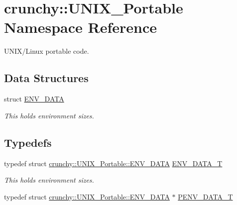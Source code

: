 \hypertarget{namespacecrunchy_1_1_u_n_i_x___portable}{}\section{crunchy\+:\+:U\+N\+I\+X\+\_\+\+Portable Namespace Reference}
\label{namespacecrunchy_1_1_u_n_i_x___portable}


U\+N\+I\+X/\+Linux portable code.  


\subsection*{Data Structures}
\begin{DoxyCompactItemize}
\item 
struct \hyperlink{structcrunchy_1_1_u_n_i_x___portable_1_1_e_n_v___d_a_t_a}{E\+N\+V\+\_\+\+D\+A\+T\+A}
\begin{DoxyCompactList}\small\item\em This holds environment sizes. \end{DoxyCompactList}\end{DoxyCompactItemize}
\subsection*{Typedefs}
\begin{DoxyCompactItemize}
\item 
typedef struct \hyperlink{structcrunchy_1_1_u_n_i_x___portable_1_1_e_n_v___d_a_t_a}{crunchy\+::\+U\+N\+I\+X\+\_\+\+Portable\+::\+E\+N\+V\+\_\+\+D\+A\+T\+A} \hyperlink{namespacecrunchy_1_1_u_n_i_x___portable_a200439e6a525bf357a766278278cda8f}{E\+N\+V\+\_\+\+D\+A\+T\+A\+\_\+\+T}
\begin{DoxyCompactList}\small\item\em This holds environment sizes. \end{DoxyCompactList}\item 
typedef struct \hyperlink{structcrunchy_1_1_u_n_i_x___portable_1_1_e_n_v___d_a_t_a}{crunchy\+::\+U\+N\+I\+X\+\_\+\+Portable\+::\+E\+N\+V\+\_\+\+D\+A\+T\+A} $\ast$ \hyperlink{namespacecrunchy_1_1_u_n_i_x___portable_a3e10341fe78682a3fd657e631e2659dc}{P\+E\+N\+V\+\_\+\+D\+A\+T\+A\+\_\+\+T}
\end{DoxyCompactItemize}
